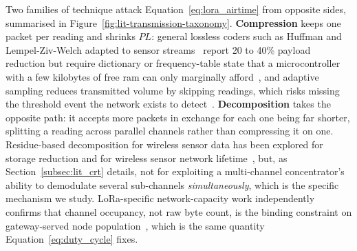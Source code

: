 Two families of technique attack Equation~\ref{eq:lora_airtime} from
opposite sides, summarised in Figure~\ref{fig:lit-transmission-taxonomy}.
\textbf{Compression} keeps one packet per reading and shrinks $PL$: general
lossless coders such as Huffman and Lempel-Ziv-Welch adapted to sensor
streams~\cite{li2018lossless, marcelloni2009energy, ziv1977universal, huffman1952method, salomon2007data} report 20 to 40\% payload reduction but
require dictionary or frequency-table state that a microcontroller with a
few kilobytes of free \gls{ram} can only marginally
afford~\cite{chen2025compression, lzw_dictionary_size}, and adaptive
sampling reduces transmitted volume by skipping readings, which risks
missing the threshold event the network exists to
detect~\cite{kjellsson2008adaptive}. \textbf{Decomposition} takes the
opposite path: it accepts more packets in exchange for each one being
far shorter, splitting a reading across parallel channels rather than
compressing it on one. Residue-based decomposition for wireless sensor
data has been explored for storage reduction and for wireless sensor
network lifetime~\cite{vidhya2021crt, khan2023fuzzycrt, rahman2022rnsenergy, djeddi2025parallelCRT}, but, as
Section~\ref{subsec:lit_crt} details, not for exploiting a multi-channel
concentrator's ability to demodulate several sub-channels
\emph{simultaneously}, which is the specific mechanism we study.
LoRa-specific network-capacity work independently confirms that channel
occupancy, not raw byte count, is the binding constraint on
gateway-served node population~\cite{centenaro2016lorawanlimits, zhang2022lorawan, chapungo2025lorawan, bicamumakuba2025lorawan, turlykozhayeva2024proactive, mozambique2021lorawan}, which is the same
quantity Equation~\ref{eq:duty_cycle} fixes.

